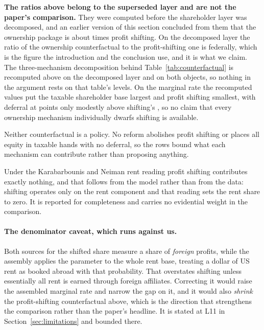 \textbf{The ratios above belong to the superseded layer and are not the paper's comparison.}
They were computed before the shareholder layer was decomposed, and an earlier version of this
section concluded from them that the ownership package is about  times profit
shifting. On the decomposed layer the ratio of the ownership counterfactual to the
profit-shifting one is  federally, which is the figure the introduction and the
conclusion use, and it is what we claim. The three-mechanism decomposition behind
Table~\ref{tab:counterfactual} is recomputed above on the decomposed layer and on both objects,
so nothing in the argument rests on that table's levels. On the marginal rate the recomputed
values put the taxable shareholder base largest and profit shifting smallest, with deferral at
 points only modestly above shifting's , so no
claim that every ownership mechanism individually dwarfs shifting is available.

Neither counterfactual is a policy. No reform abolishes profit shifting or places all equity in
taxable hands with no deferral, so the rows bound what each mechanism can contribute rather than
proposing anything.

Under the Karabarbounis and Neiman rent reading profit shifting contributes exactly nothing, and
that follows from the model rather than from the data: shifting operates only on the rent
component and that reading sets the rent share to zero. It is reported for completeness and
carries no evidential weight in the comparison.

\paragraph{The denominator caveat, which runs against us.} Both sources for the shifted share
measure a share of \emph{foreign} profits, while the assembly applies the parameter to the whole
rent base, treating a dollar of US rent as booked abroad with that probability. That overstates
shifting unless essentially all rent is earned through foreign affiliates. Correcting it would
raise the assembled marginal rate and narrow the gap on it, and it would also
\emph{shrink} the profit-shifting counterfactual above, which is the direction that strengthens
the comparison rather than the paper's headline. It is stated at L11 in
Section~\ref{sec:limitations} and bounded there.
\begin{table}[htbp]
\centering
\caption{The levers, ranked by sensitivity to parameter uncertainty rather than by importance.
Each is moved across its whole sourced or swept range with the others at central values, so a row
reports how much the answer would move if we were wrong about that parameter, not how much the
channel reduces the rate. For the latter see Table~\ref{tab:counterfactual}. Scenario.}
\label{tab:levers}

\end{table}


